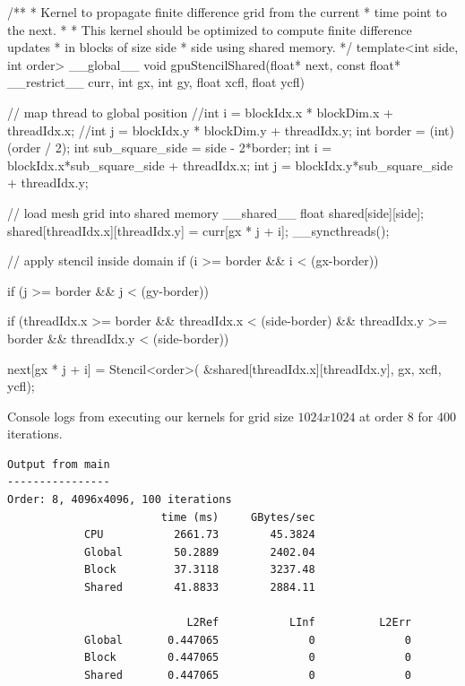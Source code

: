 \documentclass[12pt,letterpaper,twoside]{article}
\begin{document}
\begin{cpp}
/**
* Kernel to propagate finite difference grid from the current
* time point to the next.
*
* This kernel should be optimized to compute finite difference updates
* in blocks of size side * side using shared memory.
*/
template<int side, int order>
__global__
void gpuStencilShared(float* next, const float* __restrict__ curr, int gx, int gy,
                float xcfl, float ycfl) {
    
    // map thread to global position
    //int i = blockIdx.x * blockDim.x + threadIdx.x;
    //int j = blockIdx.y * blockDim.y + threadIdx.y;
    int border = (int) (order / 2);
    int sub_square_side = side - 2*border;
    int i = blockIdx.x*sub_square_side + threadIdx.x;
    int j = blockIdx.y*sub_square_side + threadIdx.y;

    // load mesh grid into shared memory
    __shared__ float shared[side][side];
    shared[threadIdx.x][threadIdx.y] = curr[gx * j + i];
    __syncthreads();

    // apply stencil inside domain
    if (i >= border && i < (gx-border)) {
        if (j >= border && j < (gy-border)) {
    
        if (threadIdx.x >= border && threadIdx.x < (side-border) &&
            threadIdx.y >= border && threadIdx.y < (side-border)) {
        
            next[gx * j + i] = Stencil<order>(
                &shared[threadIdx.x][threadIdx.y], 
                gx, 
                xcfl, 
                ycfl);
            }
        }
    }

}
   
\end{cpp}


Console logs from executing our kernels for grid size $1024x1024$
at order 8 for 400 iterations.

\begin{verbatim}
Output from main
----------------
Order: 8, 4096x4096, 100 iterations
                        time (ms)     GBytes/sec
            CPU           2661.73        45.3824
            Global        50.2889        2402.04
            Block         37.3118        3237.48
            Shared        41.8833        2884.11

                            L2Ref           LInf          L2Err
            Global       0.447065              0              0
            Block        0.447065              0              0
            Shared       0.447065              0              0
\end{verbatim}
\end{document}
